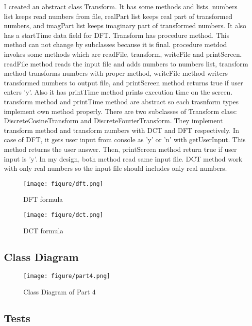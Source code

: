 \documentclass[twoside,11pt]{article}
\begin{document}
I created an abstract class Transform. It has some methods and lists. numbers list keeps read numbers from file, realPart list keeps real part of transformed numbers, and imagPart list keeps imaginary part of transformed numbers. It also has a startTime data field for DFT. Transform has procedure method. This method can not change by subclasses because it is final. procedure metdod invokes some methods which are readFile, transform, writeFile and printScreen. readFile method reads the input file and adds numbers to numbers list, transform method transforms numbers with proper method, writeFile method writers transformed numbers to output file, and printScreen method returns true if user enters 'y'. Also it has printTime method prints execution time on the screen. transform method and printTime method are abstract so each trasnform types implement own method properly. There are two subclasses of Transform class: DiscreteCosineTransform and DiscreteFourierTransform. They implement transform method and transform numbers with DCT and DFT respectively.\newline
In case of DFT, it gets user input from console as 'y' or 'n' with getUserInput. This method returns the user answer. Then, printScreen method return true if user input is 'y'.\newline
In my design, both method read same input file.
DCT method work with only real numbers so the input file should includes only real numbers.

\newpage

\begin{figure}[h]
\caption{DFT formula}
\centering
\texttt{[image: figure/dft.png]}
\end{figure}

\begin{figure}[h]
\caption{DCT formula}
\centering
\texttt{[image: figure/dct.png]}
\end{figure}

\subsection{Class Diagram}

\begin{figure}[h]
\caption{Class Diagram of Part 4}
\centering
\texttt{[image: figure/part4.png]}
\end{figure}

\newpage

\subsection{Tests}
\end{document}
